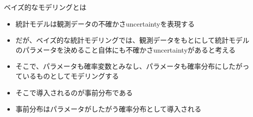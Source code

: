 \documentclass[aspectratio=169,unicode,dvipdfmx,14pt]{beamer}
\begin{document}
\begin{frame}{ベイズ的なモデリングとは}
\begin{itemize}
\item 統計モデルは観測データの不確かさuncertaintyを表現する
\item だが、ベイズ的な統計モデリングでは、観測データをもとにして統計モデルのパラメータを決めること自体にも不確かさuncertaintyがあると考える
\item そこで、パラメータも確率変数とみなし、パラメータも確率分布にしたがっているものとしてモデリングする
\item そこで導入されるのが事前分布である
\item 事前分布はパラメータがしたがう確率分布として導入される
\end{itemize}
\end{frame}
\end{document}
